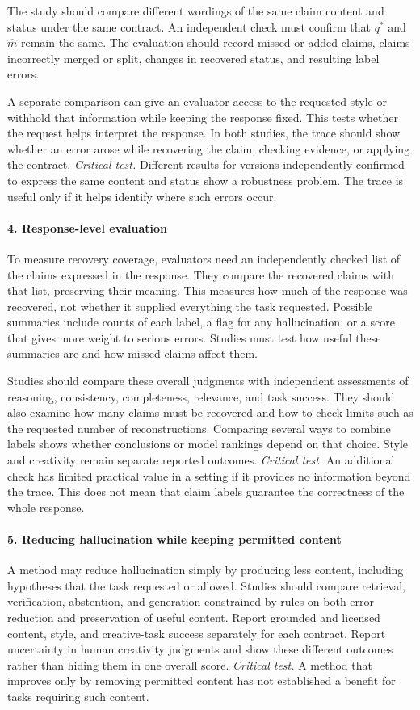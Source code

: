 \documentclass{clv2025}
\begin{document}
The study should compare different wordings of the same claim content and
status under the same contract. An independent check must confirm that
$q^*$ and $\widehat{m}$ remain the same. The evaluation should record missed
or added claims, claims incorrectly merged or split, changes in recovered
status, and resulting label errors.

A separate comparison can give an evaluator access to the requested style
or withhold that information while keeping the response fixed. This tests
whether the request helps interpret the response. In both studies, the trace
should show whether an error arose while recovering the claim, checking
evidence, or applying the contract.
\emph{Critical test.} Different results for versions independently confirmed
to express the same content and status show a robustness problem. The trace
is useful only if it helps identify where such errors occur.

\paragraph{4. Response-level evaluation}
To measure recovery coverage, evaluators need an independently checked list
of the claims expressed in the response. They compare the recovered claims
with that list, preserving their meaning. This measures how much of the
response was recovered, not whether it supplied everything the task requested.
Possible summaries include counts of each label, a flag for any hallucination,
or a score that gives more weight to serious errors. Studies must test how
useful these summaries are and how missed claims affect them.

Studies should compare these overall judgments with independent assessments of
reasoning, consistency, completeness, relevance, and task success. They should
also examine how many claims must be recovered and how to check limits such
as the requested number of reconstructions. Comparing several ways to combine
labels shows whether conclusions or model rankings depend on that choice.
Style and creativity remain separate reported outcomes.
\emph{Critical test.} An additional check has limited practical value in a
setting if it provides no information beyond the trace. This does not mean
that claim labels guarantee the correctness of the whole response.

\paragraph{5. Reducing hallucination while keeping permitted content}
A method may reduce hallucination simply by producing less content,
including hypotheses that the task requested or allowed. Studies should
compare retrieval, verification, abstention, and generation constrained by
rules on both error reduction and preservation of useful content. Report
grounded and licensed content, style, and creative-task success separately
for each contract. Report uncertainty in human creativity judgments and
show these different outcomes rather than hiding them in one overall score.
\emph{Critical test.} A method that improves only by removing permitted
content has not established a benefit for tasks requiring such content.
\end{document}
